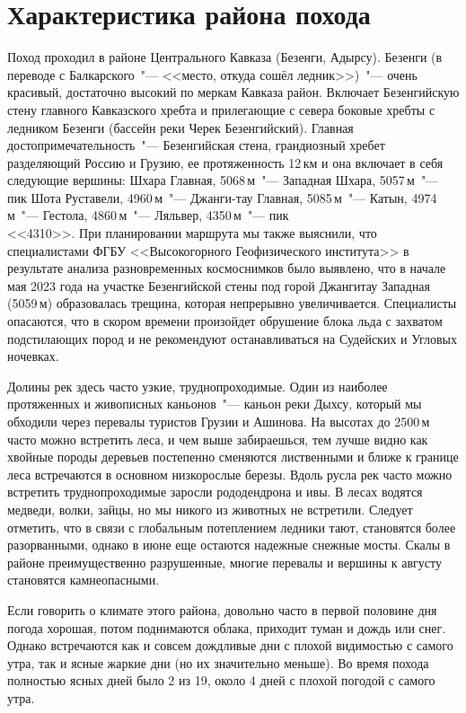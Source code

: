 \section{Характеристика района похода}\label{sec:characteristics_of_area}
    Поход проходил в районе Центрального Кавказа (Безенги, Адырсу). Безенги (в переводе с Балкарского~"---
    <<место, откуда сошёл ледник>>)~"--- очень красивый, достаточно высокий по меркам Кавказа район. Включает
    Безенгийскую стену главного Кавказского хребта и прилегающие с севера боковые хребты с ледником Безенги
    (бассейн реки Черек Безенгийский). Главная достопримечательность~"--- Безенгийская стена, грандиозный хребет
    разделяющий Россию и Грузию, ее протяженность 12\,км и она включает в себя следующие вершины: Шхара Главная,
    5068\,м~"--- Западная Шхара, 5057\,м~"--- пик Шота Руставели, 4960\,м~"--- Джанги-тау Главная, 5085\,м~"---
    Катын, 4974\,м~"--- Гестола, 4860\,м~"--- Ляльвер, 4350\,м~"--- пик\\ <<4310>>. При планировании маршрута мы
    также выяснили, что специалистами ФГБУ <<Высокогорного Геофизического института>> в результате анализа
    разновременных космоснимков было выявлено, что в начале мая 2023 года на участке Безенгийской стены под горой
    Джангитау Западная (5059\,м) образовалась трещина, которая непрерывно увеличивается. Специалисты опасаются, что
    в скором времени произойдет обрушение блока льда с захватом подстилающих пород и не рекомендуют останавливаться
    на Судейских и Угловых ночевках.

    Долины рек здесь часто узкие, труднопроходимые. Один из наиболее протяженных и живописных каньонов~"--- каньон реки
    Дыхсу, который мы обходили через перевалы туристов Грузии и Ашинова. На высотах до 2500\,м часто можно встретить леса,
    и чем выше забираешься, тем лучше видно как хвойные породы деревьев постепенно сменяются лиственными и ближе к границе
    леса встречаются в основном низкорослые березы. Вдоль русла рек часто можно встретить труднопроходимые заросли рододендрона
    и ивы. В лесах водятся медведи, волки, зайцы, но мы никого из животных не встретили. Следует отметить, что в связи с
    глобальным потеплением ледники тают, становятся более разорванными, однако в июне еще остаются надежные снежные мосты.
    Скалы в районе преимущественно разрушенные, многие перевалы и вершины к августу становятся камнеопасными. 

    Если говорить о климате этого района, довольно часто в первой половине дня погода хорошая, потом поднимаются облака,
    приходит туман и дождь или снег. Однако встречаются как и совсем дождливые дни с плохой видимостью с самого утра, так
    и ясные жаркие дни (но их значительно меньше). Во время похода полностью ясных дней было 2 из 19, около 4 дней с плохой
    погодой с самого утра.

